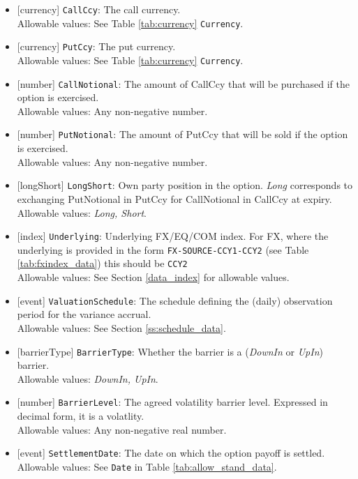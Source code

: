 \begin{itemize}
  \item{}[currency] \lstinline!CallCcy!: The call currency. \\
  Allowable values: See Table \ref{tab:currency} \lstinline!Currency!.
  \item{}[currency] \lstinline!PutCcy!: The put currency. \\
  Allowable values: See Table \ref{tab:currency} \lstinline!Currency!.
  \item{}[number] \lstinline!CallNotional!: The amount of CallCcy that will be purchased if the option is exercised. \\
  Allowable values: Any non-negative number.
    \item{}[number] \lstinline!PutNotional!: The amount of PutCcy that will be sold if the option is exercised. \\
  Allowable values: Any non-negative number.
  \item{}[longShort] \lstinline!LongShort!: Own party position in the option. \emph{Long} corresponds to exchanging PutNotional in PutCcy for CallNotional in CallCcy at expiry. \\
  Allowable values: \emph{Long, Short}.
  \item{}[index] \lstinline!Underlying!: Underlying FX/EQ/COM index. For FX, where the underlying is provided in the form \lstinline!FX-SOURCE-CCY1-CCY2! (see Table \ref{tab:fxindex_data}) this should be \lstinline!CCY2! \\
  Allowable values: See Section \ref{data_index} for allowable values.
  \item{}[event] \lstinline!ValuationSchedule!: The schedule defining the (daily) observation period for the variance accrual. \\
  Allowable values: See Section \ref{ss:schedule_data}.
  \item{}[barrierType] \lstinline!BarrierType!: Whether the barrier is a (\emph{DownIn} or \emph{UpIn}) barrier. \\
  Allowable values: \emph{DownIn, UpIn}.
  \item{}[number] \lstinline!BarrierLevel!: The agreed volatility barrier level. Expressed in decimal form, it is a volatlity.\\
  Allowable values: Any non-negative real number.
  \item{}[event] \lstinline!SettlementDate!: The date on which the option payoff is settled. \\
  Allowable values: See \lstinline!Date! in Table \ref{tab:allow_stand_data}.

\end{itemize}
